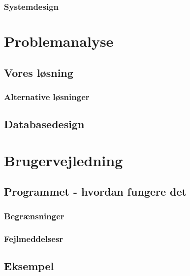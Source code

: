 \documentclass[final]{rapport1}
\begin{document}
\subsection{Systemdesign}



\chapter{Problemanalyse}
\section{Vores løsning}

\subsection{Alternative løsninger}

\section{Databasedesign}






\chapter{Brugervejledning}
\section{Programmet - hvordan fungere det}

\subsection{Begrænsninger}
\subsection{Fejlmeddelsesr}
\section{Eksempel}
\end{document}
